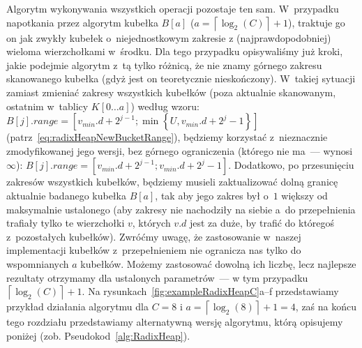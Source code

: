 Algorytm wykonywania wszystkich operacji pozostaje ten sam. W~przypadku napotkania przez algorytm kubełka $B \left[ a  \right]$ ($a = \left \lceil \log_{2} \left( C \right) \right \rceil + 1$), traktuje go on jak zwykły kubełek o~niejednostkowym zakresie z (najprawdopodobniej) wieloma wierzchołkami w~środku.
Dla tego przypadku opisywaliśmy już kroki, jakie podejmie algorytm z~tą tylko różnicą, że nie znamy górnego zakresu skanowanego kubełka (gdyż jest on teoretycznie nieskończony).
W~takiej sytuacji zamiast zmieniać zakresy wszystkich kubełków (poza aktualnie skanowanym, ostatnim w~tablicy $K \left[ 0 \dots a \right]$) według wzoru: $B \left[ j \right].range = \left[ v_{min}.d + 2 ^{j-1} ; \min \left\{ U, v_{min}.d + 2^{j} - 1 \right\} \right]$ (patrz~\ref{eq:radixHeapNewBucketRange}), będziemy korzystać z~nieznacznie zmodyfikowanej jego wersji, bez górnego ograniczenia (którego nie ma~--- wynosi $\infty$): $B \left[ j \right].range = \left[ v_{min}.d + 2 ^{j-1} ; v_{min}.d + 2^{j} - 1 \right]$.
Dodatkowo, po przesunięciu zakresów wszystkich kubełków, będziemy musieli zaktualizować dolną granicę aktualnie badanego kubełka $B \left[ a \right]$, tak aby jego zakres był o~$1$ większy od maksymalnie ustalonego (aby zakresy nie nachodziły na siebie a~do przepełnienia trafiały tylko te wierzchołki $v$, których $v.d$ jest za duże, by trafić do któregoś z~pozostałych kubełków).
Zwróćmy uwagę, że zastosowanie w~naszej implementacji kubełków z~przepełnieniem nie ogranicza nas tylko do wspomnianych $a$ kubełków.
Możemy zastosować dowolną ich liczbę, lecz najlepsze rezultaty otrzymamy dla ustalonych parametrów~--- w tym przypadku $\left \lceil \log_{2} \left( C \right) \right \rceil + 1$.
Na rysunkach~\ref{fig:exampleRadixHeapC}a--f przedstawiamy przykład działania algorytmu dla $C=8$ i $a = \left \lceil \log_{2} \left( 8 \right) \right \rceil + 1 = 4$, zaś na końcu tego rozdziału przedstawiamy alternatywną wersję algorytmu, którą opisujemy poniżej (zob. Pseudokod~\ref{alg:RadixHeap}).

